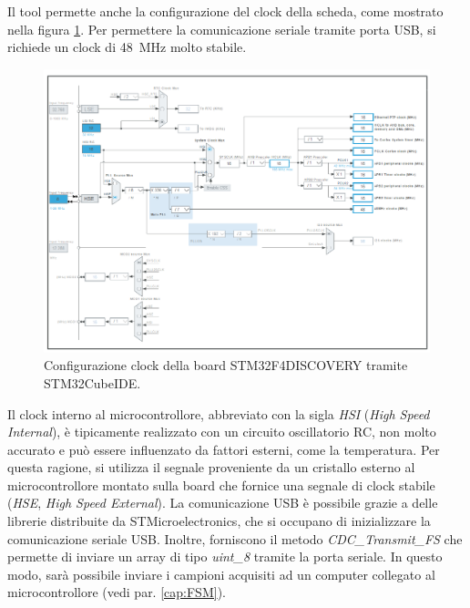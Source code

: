
Il tool permette anche la configurazione del clock della scheda, come mostrato nella figura \ref{fig:Clock}. Per permettere la comunicazione seriale tramite porta USB, si richiede un clock di \SI{48}{\mega\hertz} molto stabile. 
 \begin{figure}[tbh]
 	\centering
 	\includegraphics[width=1.4\linewidth, angle =90]{ImageFiles/Firmware/Clock}
 	\caption[Configurazione clock della board STM32F4DISCOVERY.]{Configurazione clock della board STM32F4DISCOVERY tramite STM32CubeIDE.}
 	\label{fig:Clock}
 \end{figure}
Il clock interno al microcontrollore, abbreviato con la sigla \textit{HSI} (\textit{High Speed Internal}), è tipicamente realizzato con un circuito oscillatorio RC, non molto accurato e può essere influenzato da fattori esterni, come la temperatura. Per questa ragione, si utilizza il segnale proveniente da un cristallo esterno al microcontrollore montato sulla board che fornice una segnale di clock stabile (\textit{HSE}, \textit{High Speed External}). La comunicazione USB è possibile grazie a delle librerie distribuite da STMicroelectronics, che si occupano di inizializzare la comunicazione seriale USB. Inoltre, forniscono il metodo \textit{CDC\_Transmit\_FS} che permette di inviare un array di tipo \textit{uint\_8} tramite la porta seriale. In questo modo, sarà possibile inviare i campioni acquisiti ad un computer collegato al microcontrollore (vedi par. \ref{cap:FSM}).

\clearpage
